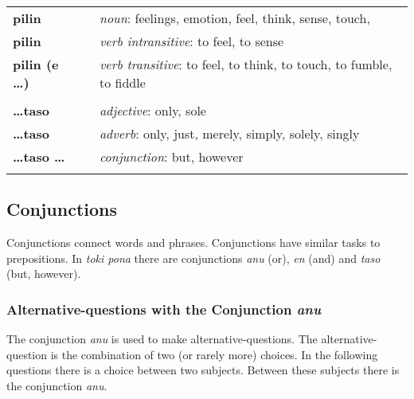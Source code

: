 \begin{supertabular}{p{2,5cm}|ll}
    \textbf{pilin}            &  & \textit{noun}: feelings, emotion, feel, think, sense, touch,                                \\
    \textbf{pilin}            &  & \textit{verb intransitive}: to feel, to sense                                               \\
    \textbf{pilin (e \dots)}  &  & \textit{verb transitive}: to feel, to think, to touch, to fumble, to fiddle                 \\
                              &  &                                                                                             \\
    \textbf{\dots taso}       &  & \textit{adjective}: only, sole                                                              \\
    \textbf{\dots taso}       &  & \textit{adverb}: only, just, merely, simply, solely, singly                                 \\
    \textbf{\dots taso \dots} &  & \textit{conjunction}: but, however                                                          \\
                              &  &                                                                                             \\
\end{supertabular}

\newpage

\subsection*{Conjunctions}
Conjunctions connect words and phrases.
Conjunctions have similar tasks to prepositions.
In \textit{toki pona} there are conjunctions \textit{anu} (or),  \textit{en} (and) and \textit{taso} (but, however).

\subsubsection*{Alternative-questions with the Conjunction \textit{anu}}
The conjunction \textit{anu} is used to make alternative-questions.
The alternative-question is the combination of two (or rarely more) choices.
In the following questions there is a choice between two subjects.
Between these subjects there is the conjunction \textit{anu}.

